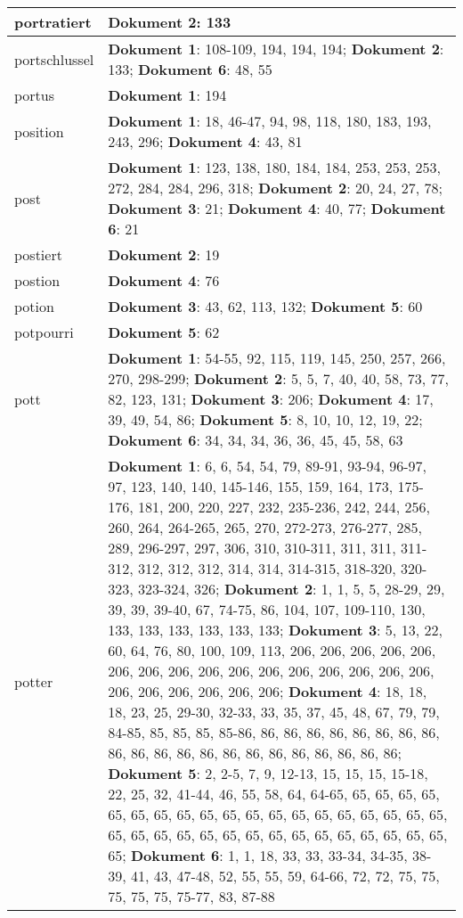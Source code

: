\documentclass[a5paper]{article}
\begin{document}
\begin{longtable}[l]{|l|p{3in}|}
\hline
portratiert & \textbf{Dokument 2}: 133 \\
\hline
portschlussel & \textbf{Dokument 1}: 108-109, 194, 194, 194; \textbf{Dokument 2}: 133; \textbf{Dokument 6}: 48, 55 \\
\hline
portus & \textbf{Dokument 1}: 194 \\
\hline
position & \textbf{Dokument 1}: 18, 46-47, 94, 98, 118, 180, 183, 193, 243, 296; \textbf{Dokument 4}: 43, 81 \\
\hline
post & \textbf{Dokument 1}: 123, 138, 180, 184, 184, 253, 253, 253, 272, 284, 284, 296, 318; \textbf{Dokument 2}: 20, 24, 27, 78; \textbf{Dokument 3}: 21; \textbf{Dokument 4}: 40, 77; \textbf{Dokument 6}: 21 \\
\hline
postiert & \textbf{Dokument 2}: 19 \\
\hline
postion & \textbf{Dokument 4}: 76 \\
\hline
potion & \textbf{Dokument 3}: 43, 62, 113, 132; \textbf{Dokument 5}: 60 \\
\hline
potpourri & \textbf{Dokument 5}: 62 \\
\hline
pott & \textbf{Dokument 1}: 54-55, 92, 115, 119, 145, 250, 257, 266, 270, 298-299; \textbf{Dokument 2}: 5, 5, 7, 40, 40, 58, 73, 77, 82, 123, 131; \textbf{Dokument 3}: 206; \textbf{Dokument 4}: 17, 39, 49, 54, 86; \textbf{Dokument 5}: 8, 10, 10, 12, 19, 22; \textbf{Dokument 6}: 34, 34, 34, 36, 36, 45, 45, 58, 63 \\
\hline
potter & \textbf{Dokument 1}: 6, 6, 54, 54, 79, 89-91, 93-94, 96-97, 97, 123, 140, 140, 145-146, 155, 159, 164, 173, 175-176, 181, 200, 220, 227, 232, 235-236, 242, 244, 256, 260, 264, 264-265, 265, 270, 272-273, 276-277, 285, 289, 296-297, 297, 306, 310, 310-311, 311, 311, 311-312, 312, 312, 312, 314, 314, 314-315, 318-320, 320-323, 323-324, 326; \textbf{Dokument 2}: 1, 1, 5, 5, 28-29, 29, 39, 39, 39-40, 67, 74-75, 86, 104, 107, 109-110, 130, 133, 133, 133, 133, 133, 133; \textbf{Dokument 3}: 5, 13, 22, 60, 64, 76, 80, 100, 109, 113, 206, 206, 206, 206, 206, 206, 206, 206, 206, 206, 206, 206, 206, 206, 206, 206, 206, 206, 206, 206, 206, 206; \textbf{Dokument 4}: 18, 18, 18, 23, 25, 29-30, 32-33, 33, 35, 37, 45, 48, 67, 79, 79, 84-85, 85, 85, 85, 85-86, 86, 86, 86, 86, 86, 86, 86, 86, 86, 86, 86, 86, 86, 86, 86, 86, 86, 86, 86, 86, 86; \textbf{Dokument 5}: 2, 2-5, 7, 9, 12-13, 15, 15, 15, 15-18, 22, 25, 32, 41-44, 46, 55, 58, 64, 64-65, 65, 65, 65, 65, 65, 65, 65, 65, 65, 65, 65, 65, 65, 65, 65, 65, 65, 65, 65, 65, 65, 65, 65, 65, 65, 65, 65, 65, 65, 65, 65, 65, 65, 65, 65; \textbf{Dokument 6}: 1, 1, 18, 33, 33, 33-34, 34-35, 38-39, 41, 43, 47-48, 52, 55, 55, 59, 64-66, 72, 72, 75, 75, 75, 75, 75, 75-77, 83, 87-88 \\

\end{longtable}
\end{document}
